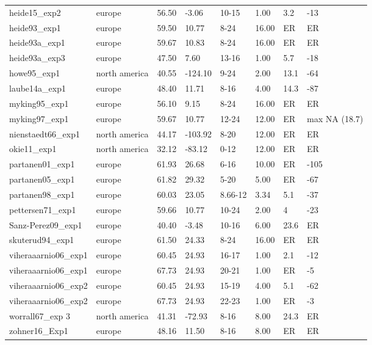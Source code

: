 \documentclass{article}
\begin{document}
\begin{table}[ht]
\begin{tabular}{|p{}|p{}|p{}|p{}|p{}|p{}|p{}|p{}|}
  heide15\_exp2 & europe & 56.50 & -3.06 & 10-15 & 1.00 & 3.2 & -13 \\ 
  heide93\_exp1 & europe & 59.50 & 10.77 & 8-24 & 16.00 & ER & ER \\ 
  heide93a\_exp1 & europe & 59.67 & 10.83 & 8-24 & 16.00 & ER & ER \\ 
  heide93a\_exp3 & europe & 47.50 & 7.60 & 13-16 & 1.00 & 5.7 & -18 \\ 
  howe95\_exp1 & north america & 40.55 & -124.10 & 9-24 & 2.00 & 13.1 & -64 \\ 
  laube14a\_exp1 & europe & 48.40 & 11.71 & 8-16 & 4.00 & 14.3 & -87 \\ 
  myking95\_exp1 & europe & 56.10 & 9.15 & 8-24 & 16.00 & ER & ER \\ 
  myking97\_exp1 & europe & 59.67 & 10.77 & 12-24 & 12.00 & ER & max NA (18.7) \\ 
  nienstaedt66\_exp1 & north america & 44.17 & -103.92 & 8-20 & 12.00 & ER & ER \\ 
  okie11\_exp1 & north america & 32.12 & -83.12 & 0-12 & 12.00 & ER & ER \\ 
  partanen01\_exp1 & europe & 61.93 & 26.68 & 6-16 & 10.00 & ER & -105 \\ 
  partanen05\_exp1 & europe & 61.82 & 29.32 & 5-20 & 5.00 & ER & -67 \\ 
  partanen98\_exp1 & europe & 60.03 & 23.05 & 8.66-12 & 3.34 & 5.1 & -37 \\ 
  pettersen71\_exp1 & europe & 59.66 & 10.77 & 10-24 & 2.00 & 4 & -23 \\ 
  Sanz-Perez09\_exp1 & europe & 40.40 & -3.48 & 10-16 & 6.00 & 23.6 & ER \\ 
  skuterud94\_exp1 & europe & 61.50 & 24.33 & 8-24 & 16.00 & ER & ER \\ 
  viheraaarnio06\_exp1 & europe & 60.45 & 24.93 & 16-17 & 1.00 & 2.1 & -12 \\ 
  viheraaarnio06\_exp1 & europe & 67.73 & 24.93 & 20-21 & 1.00 & ER & -5 \\ 
  viheraaarnio06\_exp2 & europe & 60.45 & 24.93 & 15-19 & 4.00 & 5.1 & -62 \\ 
  viheraaarnio06\_exp2 & europe & 67.73 & 24.93 & 22-23 & 1.00 & ER & -3 \\ 
  worrall67\_exp 3 & north america & 41.31 & -72.93 & 8-16 & 8.00 & 24.3 & ER \\ 
  zohner16\_Exp1 & europe & 48.16 & 11.50 & 8-16 & 8.00 & ER & ER \\ 
   \hline
\end{tabular}
\end{table}\clearpage
\end{document}
